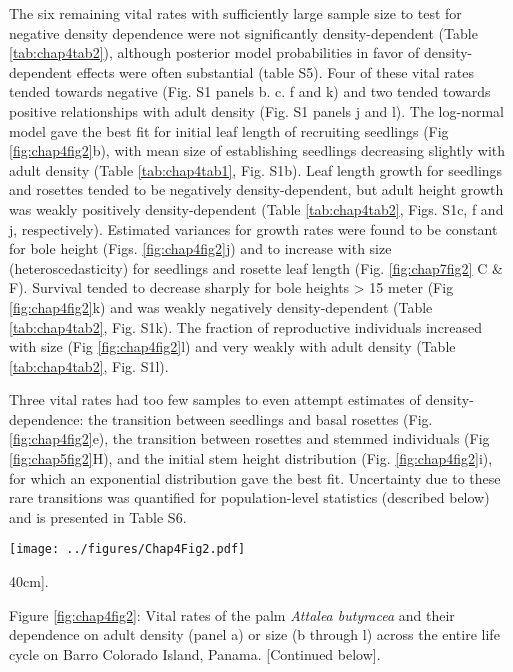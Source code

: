 \documentclass[b5paper,justified]{tufte-book} %
\begin{document}
\begin{fullwidth}
The six remaining vital rates with sufficiently large sample size to test for negative density dependence were not significantly density-dependent (Table \ref{tab:chap4tab2}), although posterior model probabilities in favor of density-dependent effects were often substantial (table S5).  Four of these vital rates tended towards negative (Fig. S1 panels b. c. f and k) and two tended towards positive relationships with adult density (Fig. S1 panels j and l). The log-normal model gave the best fit for initial leaf length of recruiting seedlings (Fig \ref{fig:chap4fig2}b), with mean size of establishing seedlings decreasing slightly with adult density (Table \ref{tab:chap4tab1}, Fig. S1b). Leaf length growth for seedlings and rosettes tended to be negatively density-dependent, but adult height growth was weakly positively density-dependent (Table \ref{tab:chap4tab2}, Figs. S1c, f and j, respectively). Estimated variances for growth rates were found to be constant for bole height (Figs. \ref{fig:chap4fig2}j) and to increase with size (heteroscedasticity) for seedlings and rosette leaf length (Fig. \ref{fig:chap7fig2} C \& F). Survival tended to decrease sharply for bole heights > 15 meter (Fig \ref{fig:chap4fig2}k) and was weakly negatively density-dependent (Table \ref{tab:chap4tab2}, Fig. S1k). The fraction of reproductive individuals increased with size (Fig \ref{fig:chap4fig2}l) and very weakly with adult density (Table \ref{tab:chap4tab2}, Fig. S1l). 

Three vital rates had too few samples to even attempt estimates of density-dependence: the transition between seedlings and basal rosettes (Fig. \ref{fig:chap4fig2}e), the transition between rosettes and stemmed individuals (Fig \ref{fig:chap5fig2}H), and the initial stem height distribution (Fig. \ref{fig:chap4fig2}i), for which an exponential distribution gave the best fit. Uncertainty due to these rare transitions was quantified for population-level statistics (described below) and is presented in Table S6.  


\begin{figure*}
\hspace*{.75cm}\texttt{[image: ../figures/Chap4Fig2.pdf]}
\caption[Vital rates of the palm \textit{Attalea butyracea}][40cm]{.}  
\label{fig:chap4fig2}
\begin{minipage}{14cm}
\small
Figure \ref{fig:chap4fig2}: Vital rates of the palm \textit{Attalea butyracea} and their dependence on adult density (panel a) or size (b through l) across the entire life cycle on Barro Colorado Island, Panama. \footnotesize [Continued below].
\end{minipage}
\end{figure*}



\end{fullwidth}
\end{document}
